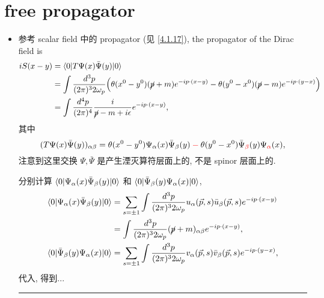 \section{free propagator}
\begin{itemize}
	\item 参考 scalar field 中的 propagator (见 \eqref{4.1.17}), the propagator of the Dirac field is
	\begin{align}
		i S(x - y) &= \braket{0 | T \Psi(x) \bar{\Psi}(y) | 0} \notag \\
		&= \int \frac{d^3 p}{(2 \pi)^3 2 \omega_p} \Big( \theta(x^0 - y^0) (\cancel{p} + m) e^{- i p \cdot (x - y)} - \theta(y^0 - x^0) (\cancel{p} - m) e^{- i p \cdot (y - x)} \Big) \notag \\
		&= \int \frac{d^4 p}{(2 \pi)^4} \frac{i}{\cancel{p} - m + i \epsilon} e^{- i p \cdot (x - y)}, \label{8.6.1}
	\end{align}
	其中
	\begin{equation}
		(T \Psi(x) \bar{\Psi}(y))_{\alpha \beta} = \theta(x^0 - y^0) \Psi_\alpha(x) \bar{\Psi}_\beta(y) \mathcolor{red}{-} \theta(y^0 - x^0) \bar{\Psi}_{\mathcolor{red}{\beta}}(y) \Psi_{\mathcolor{red}{\alpha}}(x),
	\end{equation}
	注意到这里交换 $\Psi, \bar{\Psi}$ 是产生湮灭算符层面上的, 不是 spinor 层面上的.
	
	\begin{tcolorbox}[title=calculation:]
		分别计算 $\braket{0 | \Psi_\alpha(x) \bar{\Psi}_\beta(y) | 0}$ 和 $\braket{0 | \bar{\Psi}_\beta(y) \Psi_\alpha(x) | 0}$,
		\begin{align}
			\braket{0 | \Psi_\alpha(x) \bar{\Psi}_\beta(y) | 0} &= \sum_{s = \pm 1} \int \frac{d^3 p}{(2 \pi)^3 2 \omega_p} u_\alpha(\vec{p}, s) \bar{u}_\beta(\vec{p}, s) e^{- i p \cdot (x - y)} \notag \\
			&= \int \frac{d^3 p}{(2 \pi)^3 2 \omega_p} (\cancel{p} + m)_{\alpha \beta} e^{- i p \cdot (x - y)}, \\
			\braket{0 | \bar{\Psi}_\beta(y) \Psi_\alpha(x) | 0} &= \sum_{s = \pm 1} \int \frac{d^3 p}{(2 \pi)^3 2 \omega_p} v_\alpha(\vec{p}, s) \bar{v}_\beta(\vec{p}, s) e^{- i p \cdot (y - x)},
		\end{align}
		代入, 得到...
		
		\noindent\rule[0.5ex]{\linewidth}{0.5pt} %
		

\end{tcolorbox}
\end{itemize}
